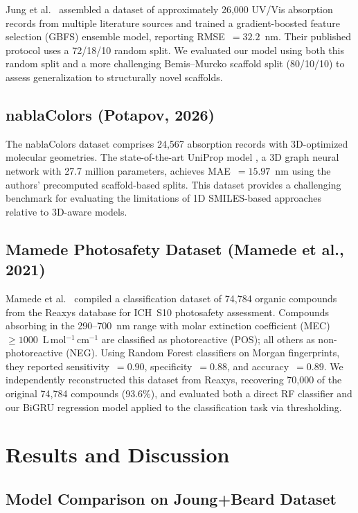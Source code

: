 \documentclass[11pt,a4paper]{article}
\begin{document}
Jung et al.\ \cite{jung2024} assembled a dataset of approximately 26,000 UV/Vis absorption records from multiple literature sources and trained a gradient-boosted feature selection (GBFS) ensemble model, reporting RMSE~$= 32.2$~nm. Their published protocol uses a 72/18/10 random split. We evaluated our model using both this random split and a more challenging Bemis--Murcko scaffold split \cite{bemisMurckoPropertiesKnown1996} (80/10/10) to assess generalization to structurally novel scaffolds.

\subsection{nablaColors (Potapov, 2026)}

The nablaColors dataset \cite{potapov2026nablacolors} comprises 24,567 absorption records with 3D-optimized molecular geometries. The state-of-the-art UniProp model \cite{uniprop2025}, a 3D graph neural network with 27.7 million parameters, achieves MAE~$= 15.97$~nm using the authors' precomputed scaffold-based splits. This dataset provides a challenging benchmark for evaluating the limitations of 1D SMILES-based approaches relative to 3D-aware models.

\subsection{Mamede Photosafety Dataset (Mamede et al., 2021)}

Mamede et al.\ \cite{mamede2021} compiled a classification dataset of 74,784 organic compounds from the Reaxys database for ICH~S10 photosafety assessment. Compounds absorbing in the 290--700~nm range with molar extinction coefficient (MEC) $\geq 1000$~L\,mol$^{-1}$\,cm$^{-1}$ are classified as photoreactive (POS); all others as non-photoreactive (NEG). Using Random Forest classifiers on Morgan fingerprints, they reported sensitivity~$= 0.90$, specificity~$= 0.88$, and accuracy~$= 0.89$. We independently reconstructed this dataset from Reaxys, recovering 70,000 of the original 74,784 compounds (93.6\%), and evaluated both a direct RF classifier and our BiGRU regression model applied to the classification task via thresholding.

\section{Results and Discussion}

\subsection{Model Comparison on Joung+Beard Dataset}
\end{document}

